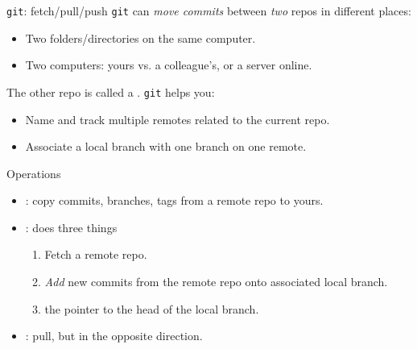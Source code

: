 \documentclass[12pt,aspectratio=169]{beamer}
\begin{document}
\begin{frame}{\texttt{git}: fetch/pull/push}
  \texttt{git} can \emph{move commits} between \emph{two} repos in different places:
  \begin{itemize}
    \item Two folders/directories on the same computer.
    \item Two computers: yours vs. a colleague's, or a server online.
  \end{itemize}

  The other repo is called a . \texttt{git} helps you:
  \begin{itemize}
    \item Name and track multiple remotes related to the current repo.
    \item Associate a local branch with one branch on one remote.
  \end{itemize}

  \medskip
  Operations
  \begin{itemize}
    \item {}: copy commits, branches, tags from a remote repo to yours.
    \item {}: does three things
          \begin{enumerate}
            \item Fetch a remote repo.
            \item \emph{Add} new commits from the remote repo onto associated local branch.
            \item {} the pointer to the head of the local branch.
          \end{enumerate}

    \item {}: pull, but in the opposite direction.
  \end{itemize}

\end{frame}
\end{document}
